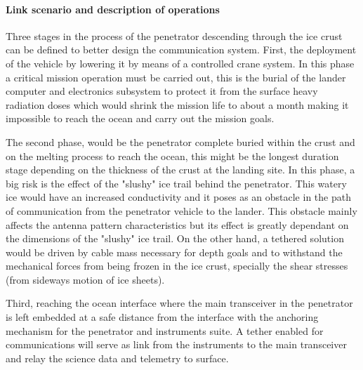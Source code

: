 
\paragraph{Link scenario and description of operations}
Three stages in the process of the penetrator descending through the ice crust can be defined to better design the communication system. First, the deployment of the vehicle by lowering it by means of a controlled crane system. In this phase a critical mission operation must be carried out, this is the burial of the lander computer and electronics subsystem to protect it from the surface heavy radiation doses which would shrink the mission life to about a month making it impossible to reach the ocean and carry out the mission goals.

The second phase, would be the penetrator complete buried within the crust and on the melting process to reach the ocean, this might be the longest duration stage depending on the thickness of the crust at the landing site. In this phase, a big risk is the effect of the "slushy" ice trail behind the penetrator. This watery ice would have an increased conductivity and it poses as an obstacle in the path of communication from the penetrator vehicle to the lander. This obstacle mainly affects the antenna pattern characteristics but its effect is greatly dependant on the dimensions of the "slushy" ice trail. On the other hand, a tethered solution would be driven by cable mass necessary for depth goals and to withstand the mechanical forces from being frozen in the ice crust, specially the shear stresses (from sideways motion of ice sheets).

Third, reaching the ocean interface where the main transceiver in the penetrator is left embedded at a safe distance from the interface with the anchoring mechanism for the penetrator and instruments suite. A tether enabled for communications will serve as link from the instruments to the main transceiver and relay the science data and telemetry to surface.

